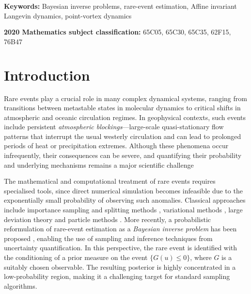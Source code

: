 \documentclass[a4paper]{article}
\numberwithin{equation}{section}
\begin{document}





{\small \textbf{Keywords:}  Bayesian inverse problems, rare-event estimation, Affine invariant Langevin dynamics, point-vortex dynamics}

{\small \textbf{2020 Mathematics subject classification:} 65C05, 65C30, 65C35, 62F15, 76B47}



\section{Introduction}
\label{sec:intro}
Rare events play a crucial role in many complex dynamical systems, ranging from transitions between metastable states in molecular dynamics \cite{KoltaiEtAl2016} to critical shifts in atmospheric and oceanic circulation regimes. In geophysical contexts, such events include persistent \emph{atmospheric blockings}---large-scale quasi-stationary flow patterns that interrupt the usual westerly circulation and can lead to prolonged periods of heat or precipitation extremes. Although these phenomena occur infrequently, their consequences can be severe, and quantifying their probability and underlying mechanisms remains a major scientific challenge \cite{DaviniEtAl2021,Hirt18,lucarini2019,Muller15,Ragone20}

The mathematical and computational treatment of rare events requires specialised tools, since direct numerical simulation becomes infeasible due to the exponentially small probability of observing such anomalies. Classical approaches include importance sampling and splitting methods \cite{Beck2017, cerou}, variational methods \cite{hartmann}, large deviation theory \cite{stadler} and particle methods \cite{delmoral}. More recently, a probabilistic reformulation of rare-event estimation as a \emph{Bayesian inverse problem} has been proposed \cite{Wagner21}, enabling the use of sampling and inference techniques from uncertainty quantification. In this perspective, the rare event is identified with the conditioning of a prior measure on the event $\{G(u)\le 0\}$, where $G$ is a suitably chosen observable. The resulting posterior is highly concentrated in a low-probability region, making it a challenging target for standard sampling algorithms.
\end{document}
